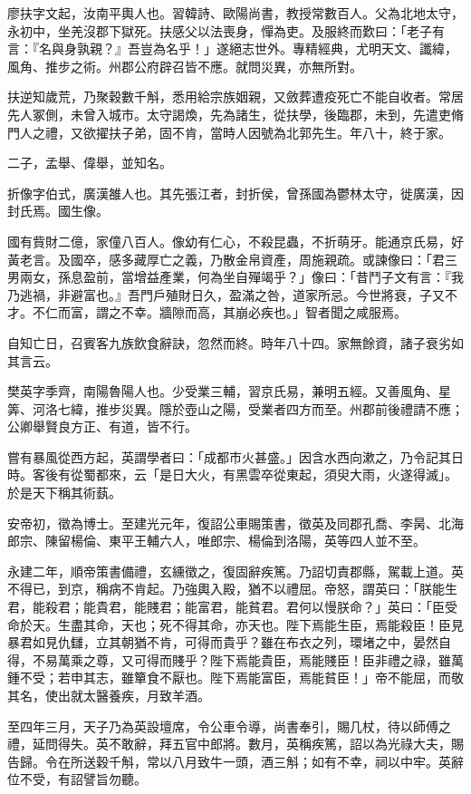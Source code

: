 \begin{pinyinscope}
廖扶字文起，汝南平輿人也。習韓詩、歐陽尚書，教授常數百人。父為北地太守，永初中，坐羌沒郡下獄死。扶感父以法喪身，憚為吏。及服終而歎曰：「老子有言：『名與身孰親？』吾豈為名乎！」遂絕志世外。專精經典，尤明天文、讖緯，風角、推步之術。州郡公府辟召皆不應。就問災異，亦無所對。

扶逆知歲荒，乃聚穀數千斛，悉用給宗族姻親，又斂葬遭疫死亡不能自收者。常居先人冢側，未曾入城市。太守謁煥，先為諸生，從扶學，後臨郡，未到，先遣吏脩門人之禮，又欲擢扶子弟，固不肯，當時人因號為北郭先生。年八十，終于家。

二子，孟舉、偉舉，並知名。

折像字伯式，廣漢雒人也。其先張江者，封折侯，曾孫國為鬱林太守，徙廣漢，因封氏焉。國生像。

國有貲財二億，家僮八百人。像幼有仁心，不殺昆蟲，不折萌牙。能通京氏易，好黃老言。及國卒，感多藏厚亡之義，乃散金帛資產，周施親疏。或諫像曰：「君三男兩女，孫息盈前，當增益產業，何為坐自殫竭乎？」像曰：「昔鬥子文有言：『我乃逃禍，非避富也。』吾門戶殖財日久，盈滿之咎，道家所忌。今世將衰，子又不才。不仁而富，謂之不幸。牆隙而高，其崩必疾也。」智者聞之咸服焉。

自知亡日，召賓客九族飲食辭訣，忽然而終。時年八十四。家無餘資，諸子衰劣如其言云。

樊英字季齊，南陽魯陽人也。少受業三輔，習京氏易，兼明五經。又善風角、星筭、河洛七緯，推步災異。隱於壺山之陽，受業者四方而至。州郡前後禮請不應；公卿舉賢良方正、有道，皆不行。

嘗有暴風從西方起，英謂學者曰：「成都市火甚盛。」因含水西向漱之，乃令記其日時。客後有從蜀都來，云「是日大火，有黑雲卒從東起，須臾大雨，火遂得滅」。於是天下稱其術蓺。

安帝初，徵為博士。至建光元年，復詔公車賜策書，徵英及同郡孔喬、李昺、北海郎宗、陳留楊倫、東平王輔六人，唯郎宗、楊倫到洛陽，英等四人並不至。

永建二年，順帝策書備禮，玄纁徵之，復固辭疾篤。乃詔切責郡縣，駕載上道。英不得已，到京，稱病不肯起。乃強輿入殿，猶不以禮屈。帝怒，謂英曰：「朕能生君，能殺君；能貴君，能賤君；能富君，能貧君。君何以慢朕命？」英曰：「臣受命於天。生盡其命，天也；死不得其命，亦天也。陛下焉能生臣，焉能殺臣！臣見暴君如見仇讎，立其朝猶不肯，可得而貴乎？雖在布衣之列，環堵之中，晏然自得，不易萬乘之尊，又可得而賤乎？陛下焉能貴臣，焉能賤臣！臣非禮之祿，雖萬鍾不受；若申其志，雖簞食不厭也。陛下焉能富臣，焉能貧臣！」帝不能屈，而敬其名，使出就太醫養疾，月致羊酒。

至四年三月，天子乃為英設壇席，令公車令導，尚書奉引，賜几杖，待以師傅之禮，延問得失。英不敢辭，拜五官中郎將。數月，英稱疾篤，詔以為光祿大夫，賜告歸。令在所送穀千斛，常以八月致牛一頭，酒三斛；如有不幸，祠以中牢。英辭位不受，有詔譬旨勿聽。


\end{pinyinscope}
